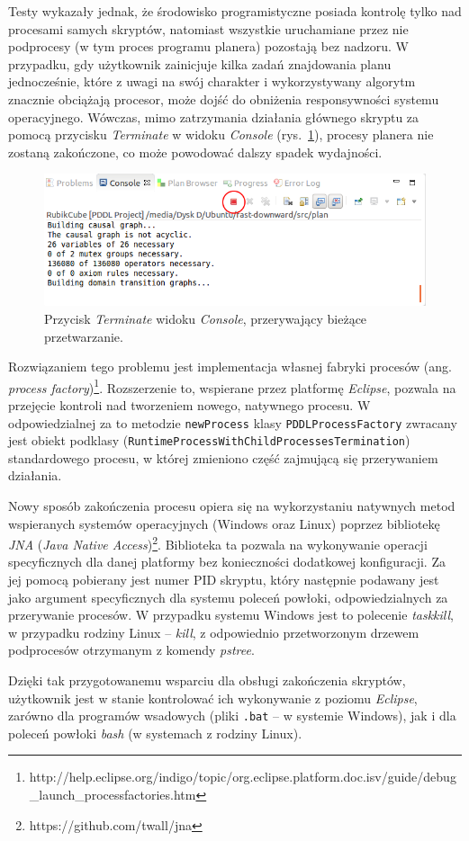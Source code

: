 Testy wykazały jednak, że środowisko programistyczne posiada kontrolę tylko nad procesami samych skryptów, natomiast wszystkie uruchamiane przez nie podprocesy (w tym proces programu planera) pozostają bez nadzoru. W przypadku, gdy użytkownik zainicjuje kilka zadań znajdowania planu jednocześnie, które z uwagi na swój charakter i wykorzystywany algorytm znacznie obciążają procesor, może dojść do obniżenia responsywności systemu operacyjnego. Wówczas, mimo zatrzymania działania głównego skryptu za pomocą przycisku \textit{Terminate} w widoku \textit{Console} (rys.~\ref{fig:terminate_button}), procesy planera nie zostaną zakończone, co może powodować dalszy spadek wydajności.

\begin{figure}[h!]
    \centering
    \includegraphics[width=\textwidth]{img/terminate_button}
    \caption{Przycisk \textit{Terminate} widoku \textit{Console}, przerywający bieżące przetwarzanie.}
    \label{fig:terminate_button}
\end{figure}

Rozwiązaniem tego problemu jest implementacja własnej fabryki procesów (ang. \textit{process factory})\footnote{http://help.eclipse.org/indigo/topic/org.eclipse.platform.doc.isv/guide/debug\_launch\_processfactories.htm}. Rozszerzenie to, wspierane przez platformę \emph{Eclipse}, pozwala na przejęcie kontroli nad tworzeniem nowego, natywnego procesu. W odpowiedzialnej za to metodzie \texttt{newProcess} klasy \texttt{PDDLProcessFactory} zwracany jest obiekt podklasy (\texttt{RuntimeProcessWithChildProcessesTermination}) standardowego procesu, w której zmieniono część zajmującą się przerywaniem działania.

Nowy sposób zakończenia procesu opiera się na wykorzystaniu natywnych metod wspieranych systemów operacyjnych (Windows oraz Linux) poprzez bibliotekę \textit{JNA} (\textit{Java Native Access})\footnote{https://github.com/twall/jna}. Biblioteka ta pozwala na wykonywanie operacji specyficznych dla danej platformy bez konieczności dodatkowej konfiguracji. Za jej pomocą pobierany jest numer PID skryptu, który następnie podawany jest jako argument specyficznych dla systemu poleceń powłoki, odpowiedzialnych za przerywanie procesów. W przypadku systemu Windows jest to polecenie \emph{taskkill}, w przypadku rodziny Linux -- \emph{kill}, z odpowiednio przetworzonym drzewem podprocesów otrzymanym z komendy \emph{pstree}.

Dzięki tak przygotowanemu wsparciu dla obsługi zakończenia skryptów, użytkownik jest w stanie kontrolować ich wykonywanie z poziomu \emph{Eclipse}, zarówno dla programów wsadowych (pliki \texttt{.bat} -- w systemie Windows), jak i dla poleceń powłoki \textit{bash} (w systemach z rodziny Linux).
